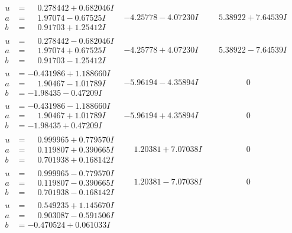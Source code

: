 \documentclass[1p]{elsarticle_modified}
\theoremstyle{definition}
\begin{document}
$$\begin{array}{c|c|c}
\begin{aligned}
u &= \phantom{-}0.278442 + 0.682046 I \\
a &= \phantom{-}1.97074 - 0.67525 I \\
b &= \phantom{-}0.91703 + 1.25412 I\end{aligned}
 & -4.25778 - 4.07230 I & \phantom{-}5.38922 + 7.64539 I \\ \hline\begin{aligned}
u &= \phantom{-}0.278442 - 0.682046 I \\
a &= \phantom{-}1.97074 + 0.67525 I \\
b &= \phantom{-}0.91703 - 1.25412 I\end{aligned}
 & -4.25778 + 4.07230 I & \phantom{-}5.38922 - 7.64539 I \\ \hline\begin{aligned}
u &= -0.431986 + 1.188660 I \\
a &= \phantom{-}1.90467 - 1.01789 I \\
b &= -1.98435 - 0.47209 I\end{aligned}
 & -5.96194 - 4.35894 I & \phantom{-0.000000 } 0 \\ \hline\begin{aligned}
u &= -0.431986 - 1.188660 I \\
a &= \phantom{-}1.90467 + 1.01789 I \\
b &= -1.98435 + 0.47209 I\end{aligned}
 & -5.96194 + 4.35894 I & \phantom{-0.000000 } 0 \\ \hline\begin{aligned}
u &= \phantom{-}0.999965 + 0.779570 I \\
a &= \phantom{-}0.119807 + 0.390665 I \\
b &= \phantom{-}0.701938 + 0.168142 I\end{aligned}
 & \phantom{-}1.20381 + 7.07038 I & \phantom{-0.000000 } 0 \\ \hline\begin{aligned}
u &= \phantom{-}0.999965 - 0.779570 I \\
a &= \phantom{-}0.119807 - 0.390665 I \\
b &= \phantom{-}0.701938 - 0.168142 I\end{aligned}
 & \phantom{-}1.20381 - 7.07038 I & \phantom{-0.000000 } 0 \\ \hline\begin{aligned}
u &= \phantom{-}0.549235 + 1.145670 I \\
a &= \phantom{-}0.903087 - 0.591506 I \\
b &= -0.470524 + 0.061033 I\end{aligned}

\end{array}$$
\end{document}
